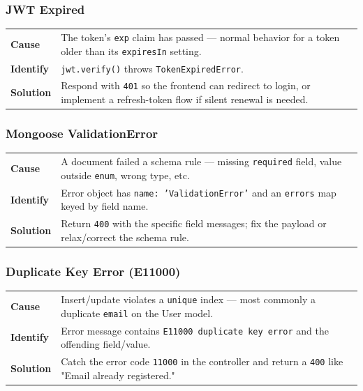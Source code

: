 \subsubsection*{JWT Expired}
\noindent\begin{tabularx}{\textwidth}{@{}>{\bfseries}p{2.3cm}X@{}}
\toprule
Cause & The token's \texttt{exp} claim has passed --- normal behavior for
a token older than its \texttt{expiresIn} setting. \\
Identify & \texttt{jwt.verify()} throws \texttt{TokenExpiredError}. \\
Solution & Respond with \texttt{401} so the frontend can redirect to
login, or implement a refresh-token flow if silent renewal is needed. \\
\bottomrule
\end{tabularx}

\subsubsection*{Mongoose ValidationError}
\noindent\begin{tabularx}{\textwidth}{@{}>{\bfseries}p{2.3cm}X@{}}
\toprule
Cause & A document failed a schema rule --- missing \texttt{required}
field, value outside \texttt{enum}, wrong type, etc. \\
Identify & Error object has \texttt{name: 'ValidationError'} and an
\texttt{errors} map keyed by field name. \\
Solution & Return \texttt{400} with the specific field messages; fix the
payload or relax/correct the schema rule. \\
\bottomrule
\end{tabularx}

\subsubsection*{Duplicate Key Error (E11000)}
\noindent\begin{tabularx}{\textwidth}{@{}>{\bfseries}p{2.3cm}X@{}}
\toprule
Cause & Insert/update violates a \texttt{unique} index --- most commonly
a duplicate \texttt{email} on the User model. \\
Identify & Error message contains \texttt{E11000 duplicate key error}
and the offending field/value. \\
Solution & Catch the error code \texttt{11000} in the controller and
return a \texttt{400} like "Email already registered." \\
\bottomrule
\end{tabularx}

